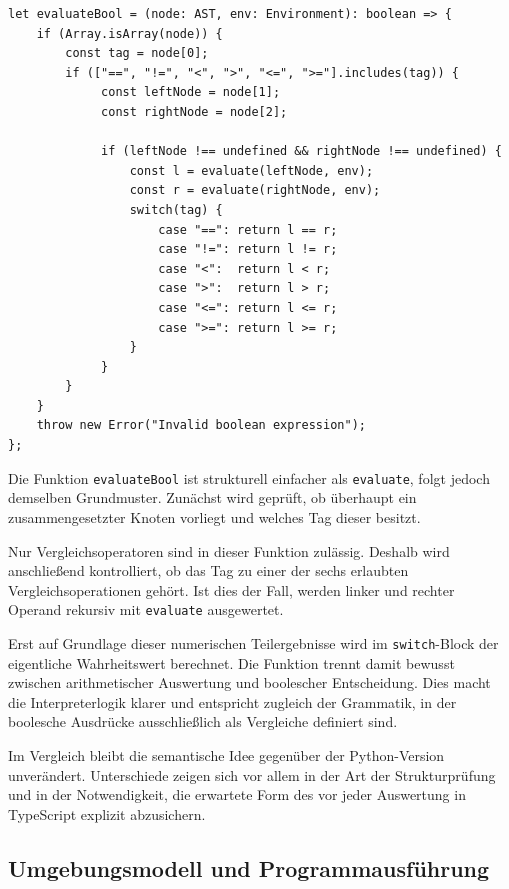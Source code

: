 \begin{listing}[htbp]
\caption{Boolesche Auswertung in TypeScript}
\label{lst:ts-evaluate-bool}
\begin{verbatim}
let evaluateBool = (node: AST, env: Environment): boolean => {
    if (Array.isArray(node)) {
        const tag = node[0];
        if (["==", "!=", "<", ">", "<=", ">="].includes(tag)) {
             const leftNode = node[1];
             const rightNode = node[2];

             if (leftNode !== undefined && rightNode !== undefined) {
                 const l = evaluate(leftNode, env);
                 const r = evaluate(rightNode, env);
                 switch(tag) {
                     case "==": return l == r;
                     case "!=": return l != r;
                     case "<":  return l < r;
                     case ">":  return l > r;
                     case "<=": return l <= r;
                     case ">=": return l >= r;
                 }
             }
        }
    }
    throw new Error("Invalid boolean expression");
};
\end{verbatim}
\end{listing}

Die Funktion \texttt{evaluateBool} ist strukturell einfacher als \texttt{evaluate}, folgt jedoch demselben Grundmuster. Zunächst wird geprüft, ob überhaupt ein zusammengesetzter Knoten vorliegt und welches Tag dieser besitzt.

Nur Vergleichsoperatoren sind in dieser Funktion zulässig. Deshalb wird anschließend kontrolliert, ob das Tag zu einer der sechs erlaubten Vergleichsoperationen gehört. Ist dies der Fall, werden linker und rechter Operand rekursiv mit \texttt{evaluate} ausgewertet.

Erst auf Grundlage dieser numerischen Teilergebnisse wird im \texttt{switch}-Block der eigentliche Wahrheitswert berechnet. Die Funktion trennt damit bewusst zwischen arithmetischer Auswertung und boolescher Entscheidung. Dies macht die Interpreterlogik klarer und entspricht zugleich der Grammatik, in der boolesche Ausdrücke ausschließlich als Vergleiche definiert sind.

Im Vergleich bleibt die semantische Idee gegenüber der Python-Version unverändert. Unterschiede zeigen sich vor allem in der Art der Strukturprüfung und in der Notwendigkeit, die erwartete Form des  vor jeder Auswertung in TypeScript explizit abzusichern.

\subsection{Umgebungsmodell und Programmausführung}


